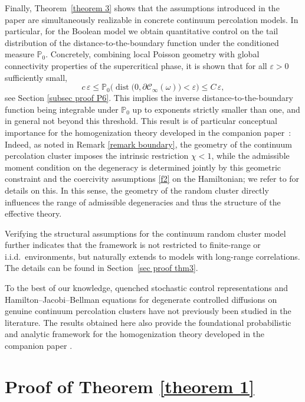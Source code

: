 \documentclass[11pt]{article}
\newcommand{\dist}{\mathop{\mathrm{dist}}}
\newcommand{\eps}{\varepsilon}
\renewcommand{\P}{\mathbb P}
\theoremstyle{rem}
\begin{document}
Finally, Theorem~\ref{theorem 3} shows that the assumptions introduced in the
paper are simultaneously realizable in concrete continuum percolation models.
In particular, for the Boolean model we obtain quantitative control on the tail distribution of the
distance-to-the-boundary function under the conditioned measure $\P_0$. Concretely, combining local Poisson geometry with global connectivity properties of the
supercritical phase, it is shown that 
for all $\eps>0$ sufficiently small,
\[
c\,\eps
\le
\P_0\big(\dist\bigl(0,\partial\mathcal C_\infty(\omega)\bigr) <\eps\big )
\le
C\,\eps,
\]
see Section \ref{subsec proof P6}. This implies the inverse distance-to-the-boundary function being
integrable under $\P_0$ up to exponents strictly smaller than one, and in
general not beyond this threshold. This result is of particular conceptual
importance for the homogenization theory developed in the companion
paper~\cite{BMM26}: Indeed, as noted in Remark \ref{remark boundary}, the geometry of the continuum percolation cluster imposes the intrinsic restriction $\chi<1$, while the admissible moment
condition on the degeneracy is determined jointly by this geometric constraint
and the coercivity assumptions \ref{f2} on the Hamiltonian; we refer to
\cite[Remark~1]{BMM26} for details on this. In this sense, the geometry of the
random cluster directly influences the range of admissible degeneracies and
thus the structure of the effective theory.

Verifying the structural assumptions for the continuum random cluster model
further indicates that the framework is not restricted to finite-range or
i.i.d.\ environments, but naturally extends to models with long-range
correlations. The details can be found in
Section~\ref{sec proof thm3}.

To the best of our knowledge, quenched stochastic control representations and Hamilton--Jacobi--Bellman equations for degenerate controlled diffusions on genuine continuum percolation clusters have not previously been studied in the literature. The results obtained here also provide the foundational probabilistic and analytic framework for the homogenization theory developed in the companion paper \cite{BMM26}.



\section{Proof of Theorem \ref{theorem 1}}\label{sec proof thm1}
\end{document}
